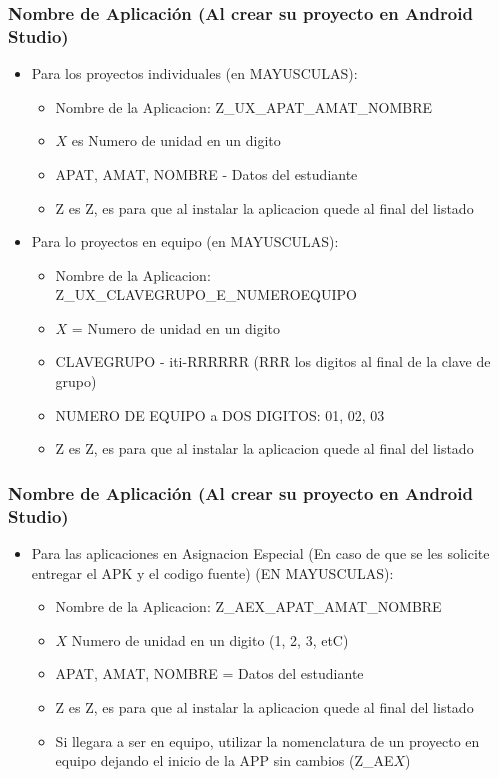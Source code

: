 \begin{frame}
\frametitle{Nombre de Aplicaci\'on (Al crear su proyecto en Android Studio)}
\begin{itemize}
\item Para los proyectos individuales (en MAYUSCULAS):
\begin{itemize}
\item Nombre de la Aplicacion: Z\_UX\_APAT\_AMAT\_NOMBRE
\item $X$ es Numero de unidad en un digito
\item APAT, AMAT, NOMBRE - Datos del estudiante
\item Z es Z, es para que al instalar la aplicacion quede al final del listado
\end{itemize}
\item Para lo proyectos en equipo (en MAYUSCULAS):
\begin{itemize}
\item Nombre de la Aplicacion: Z\_UX\_CLAVEGRUPO\_E\_NUMEROEQUIPO
\item $X$ = Numero de unidad en un digito
\item CLAVEGRUPO - iti-RRRRRR (RRR los digitos al final de la clave de grupo)
\item NUMERO DE EQUIPO a DOS DIGITOS: 01, 02, 03
\item Z es Z, es para que al instalar la aplicacion  quede al final del listado
\end{itemize}
\end{itemize}

\end{frame}


\begin{frame}
\frametitle{Nombre de Aplicaci\'on (Al crear su proyecto en Android Studio)}
\begin{itemize}
\item Para las aplicaciones en Asignacion Especial (En caso de que se les solicite entregar el APK y el codigo fuente) (EN MAYUSCULAS):
\begin{itemize}
\item Nombre de la Aplicacion: Z\_AEX\_APAT\_AMAT\_NOMBRE
\item $X$ Numero de unidad en un digito (1, 2, 3, etC)
\item APAT, AMAT, NOMBRE = Datos del estudiante
\item Z es Z, es para que al instalar la aplicacion  quede al final del listado
\item Si llegara a ser en equipo, utilizar la nomenclatura de un proyecto en equipo dejando el inicio de la APP sin cambios (Z\_AE$X$)
\end{itemize}
\end{itemize}

\end{frame}

